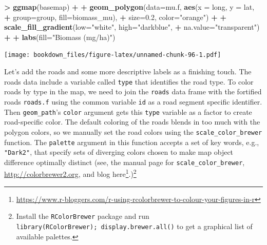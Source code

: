 \documentclass[]{krantz}
\makeatletter
\newenvironment{Shaded}{\begin{snugshade}}{\end{snugshade}}
\newcommand{\DataTypeTok}[1]{\textcolor[rgb]{0.27,0.27,0.27}{#1}}
\newcommand{\FloatTok}[1]{\textcolor[rgb]{0.06,0.06,0.06}{#1}}
\newcommand{\KeywordTok}[1]{\textcolor[rgb]{0.27,0.27,0.27}{\textbf{#1}}}
\newcommand{\NormalTok}[1]{#1}
\newcommand{\OperatorTok}[1]{\textcolor[rgb]{0.43,0.43,0.43}{\textbf{#1}}}
\newcommand{\StringTok}[1]{\textcolor[rgb]{0.5,0.5,0.5}{#1}}
\renewcommand{\href}[2]{#2\footnote{\url{#1}}}
\newenvironment{kframe}{%
\medskip{}
\setlength{\fboxsep}{.8em}
 \def\at@end@of@kframe{}%
 \ifinner\ifhmode%
  \def\at@end@of@kframe{\end{minipage}}%
  \begin{minipage}{\columnwidth}%
 \fi\fi%
 \def\FrameCommand##1{\hskip\@totalleftmargin \hskip-\fboxsep
 \colorbox{shadecolor}{##1}\hskip-\fboxsep
     \hskip-\linewidth \hskip-\@totalleftmargin \hskip\columnwidth}%
 \MakeFramed {\advance\hsize-\width
   \@totalleftmargin\z@ \linewidth\hsize
   \@setminipage}}%
 {\par\unskip\endMakeFramed%
 \at@end@of@kframe}
\renewenvironment{Shaded}{\begin{kframe}}{\end{kframe}}
\makeatother
\begin{document}
\begin{Shaded}
\begin{Highlighting}[]
\OperatorTok{>}\StringTok{ }\KeywordTok{ggmap}\NormalTok{(basemap) }\OperatorTok{+}
\OperatorTok{+}\StringTok{     }\KeywordTok{geom_polygon}\NormalTok{(}\DataTypeTok{data=}\NormalTok{mu.f, }\KeywordTok{aes}\NormalTok{(}\DataTypeTok{x =}\NormalTok{ long, }\DataTypeTok{y =}\NormalTok{ lat, }
\OperatorTok{+}\StringTok{                                 }\DataTypeTok{group=}\NormalTok{group, }\DataTypeTok{fill=}\NormalTok{biomass_mu), }
\OperatorTok{+}\StringTok{                  }\DataTypeTok{size=}\FloatTok{0.2}\NormalTok{, }\DataTypeTok{color=}\StringTok{"orange"}\NormalTok{) }\OperatorTok{+}
\OperatorTok{+}\StringTok{     }\KeywordTok{scale_fill_gradient}\NormalTok{(}\DataTypeTok{low=}\StringTok{"white"}\NormalTok{, }\DataTypeTok{high=}\StringTok{"darkblue"}\NormalTok{, }
\OperatorTok{+}\StringTok{                         }\DataTypeTok{na.value=}\StringTok{"transparent"}\NormalTok{) }\OperatorTok{+}
\OperatorTok{+}\StringTok{     }\KeywordTok{labs}\NormalTok{(}\DataTypeTok{fill=}\StringTok{"Biomass (mg/ha)"}\NormalTok{)}
\end{Highlighting}
\end{Shaded}

\texttt{[image: bookdown\_files/figure-latex/unnamed-chunk-96-1.pdf]}

Let's add the roads and some more descriptive labels as a finishing touch. The roads data include a variable called \texttt{type} that identifies the road type. To color roads by type in the map, we need to join the \texttt{roads} data frame with the fortified roads \texttt{roads.f} using the common variable \texttt{id} as a road segment specific identifier. Then \texttt{geom\_path}'s \texttt{color} argument gets this \texttt{type} variable as a factor to create road-specific color. The default coloring of the roads blends in too much with the polygon colors, so we manually set the road colors using the \texttt{scale\_color\_brewer} function. The \texttt{palette} argument in this function accepts a set of key words, e.g., \texttt{"Dark2"}, that specify sets of diverging colors chosen to make map object difference optimally distinct (see, the manual page for \texttt{scale\_color\_brewer}, \url{http://colorbrewer2.org}, and blog \href{https://www.r-bloggers.com/r-using-rcolorbrewer-to-colour-your-figures-in-r}{here}.)\footnote{Install the \texttt{RColorBrewer} package and run \texttt{library(RColorBrewer);\ display.brewer.all()} to get a graphical list of available palettes.}
\end{document}
